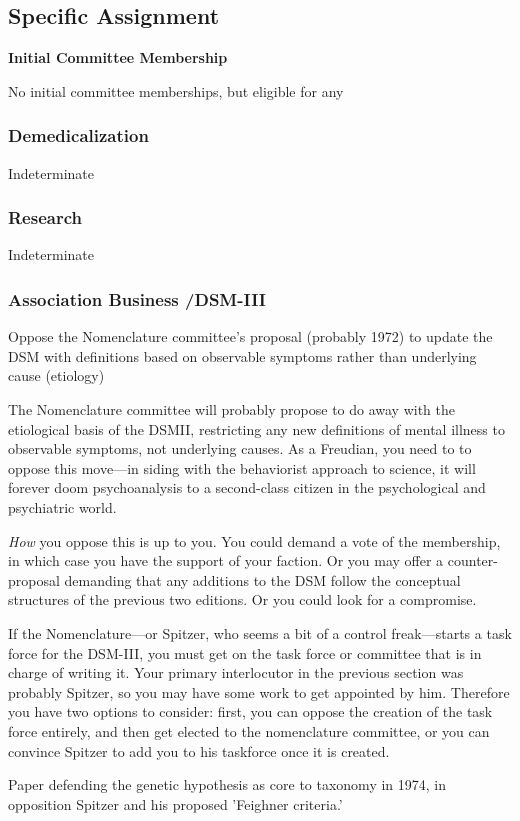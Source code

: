 \begin{refsection}
\subsection{Specific Assignment}
\label{specificassignment}

\textbf{Initial Committee Membership}

No initial committee memberships, but eligible for any

\subsubsection{Demedicalization}
\label{demedicalization}

Indeterminate

\subsubsection{Research}
\label{research}

Indeterminate

\subsubsection{Association Business \slash  DSM-III}
\label{associationbusinessdsm-iii}

\begin{proposal}[Lief]\label{proposal:lief}Oppose the Nomenclature committee's proposal (probably 1972) to update the DSM with definitions based on observable symptoms rather than underlying cause (etiology)\end{proposal}

The Nomenclature committee will probably propose to do away with the etiological basis of the DSMII, restricting any new definitions of mental illness to observable symptoms, not underlying causes. As a Freudian, you need to to oppose this move---in siding with the behaviorist approach to science, it will forever doom psychoanalysis to a second-class citizen in the psychological and psychiatric world.

\emph{How} you oppose this is up to you. You could demand a vote of the membership, in which case you have the support of your faction. Or you may offer a counter-proposal demanding that any additions to the DSM follow the conceptual structures of the previous two editions. Or you could look for a compromise. 

If the Nomenclature---or Spitzer, who seems a bit of a control freak---starts a task force for the DSM-III, you must get on the task force or committee that is in charge of writing it. Your primary interlocutor in the previous section was probably Spitzer, so you may have some work to get appointed by him. Therefore you have two options to consider: first, you can oppose the creation of the task force entirely, and then get elected to the nomenclature committee, or you can convince Spitzer to add you to his taskforce once it is created.\begin{writingtask}[Leif]\label{writingtask:leif}
Paper defending the genetic hypothesis as core to taxonomy in 1974, in opposition Spitzer and his proposed 'Feighner criteria.'
\end{writingtask}


\end{refsection}
